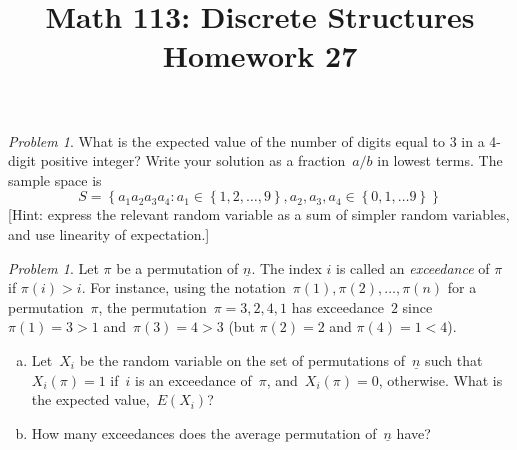 \documentclass[11pt,twoside]{amsart}
\title{Math 113: Discrete Structures\\ Homework 27}
\theoremstyle{plain}
\theoremstyle{remark}
\newtheorem{prob}[prop]{Problem}
\theoremstyle{definition}
\theoremstyle{definition}
\begin{document}
\maketitle




\begin{prob}
What is the expected value of the number of digits equal to 3 in a 4-digit
positive integer? Write your solution as a fraction~$a/b$ in lowest terms.  The sample space is
\[
  S = \left\{ a_1a_2a_3a_4: a_1\in\left\{ 1,2,\dots,9 \right\},
  a_2,a_3,a_4\in\left\{ 0,1,\dots9 \right\} \right\}
\]
 [Hint: express the relevant random variable
as a sum of simpler random variables, and use linearity of expectation.]
\end{prob}

\begin{prob}
Let $\pi$ be a permutation of $\underline{n}$.  The index $i$ is called an
\emph{exceedance} of $\pi$ if $\pi(i)>i$.  For instance, using the
notation~$\pi(1),\pi(2),\dots,\pi(n)$ for a permutation~$\pi$, the
permutation~$\pi=3,2,4,1$ has exceedance~$2$ since~$\pi(1)=3>1$
and~$\pi(3)=4>3$ (but $\pi(2)=2$ and $\pi(4)=1<4$).  
\begin{enumerate}[(a)]
  \item Let~$X_i$ be the random variable on the set of permutations
    of~$\underline{n}$ such that~$X_i(\pi)=1$ if~$i$ is an exceedance
    of~$\pi$, and~$X_i(\pi)=0$, otherwise.  What is the expected value,~$E(X_i)$?
  \item How many exceedances does the average permutation
    of~$\underline{n}$ have?
\end{enumerate}
\end{prob}
\end{document}
